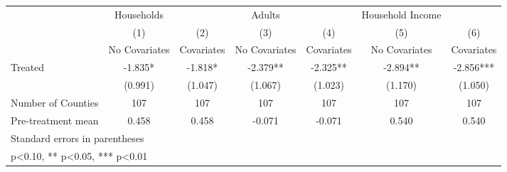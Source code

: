 {
\def\sym#1{\ifmmode^{#1}\else\(^{#1}\)\fi}
\begin{tabular}{l*{6}{c}}
\hline\hline
            &  Households   &               &      Adults   &               &Household Income   &               \\
            &\multicolumn{1}{c}{(1)}&\multicolumn{1}{c}{(2)}&\multicolumn{1}{c}{(3)}&\multicolumn{1}{c}{(4)}&\multicolumn{1}{c}{(5)}&\multicolumn{1}{c}{(6)}\\
            &\multicolumn{1}{c}{No Covariates}&\multicolumn{1}{c}{Covariates}&\multicolumn{1}{c}{No Covariates}&\multicolumn{1}{c}{Covariates}&\multicolumn{1}{c}{No Covariates}&\multicolumn{1}{c}{Covariates}\\
\hline
Treated     &      -1.835*  &      -1.818*  &      -2.379** &      -2.325** &      -2.894** &      -2.856***\\
            &     (0.991)   &     (1.047)   &     (1.067)   &     (1.023)   &     (1.170)   &     (1.050)   \\
\hline
Number of Counties&         107   &         107   &         107   &         107   &         107   &         107   \\
Pre-treatment mean&       0.458   &       0.458   &      -0.071   &      -0.071   &       0.540   &       0.540   \\
\hline\hline
\multicolumn{7}{l}{\footnotesize Standard errors in parentheses}\\
\multicolumn{7}{l}{\footnotesize * p<0.10, ** p<0.05, *** p<0.01}\\
\end{tabular}
}

